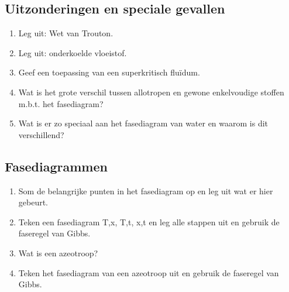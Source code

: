 \documentclass[12pt]{article}
\begin{document}
    \subsection{Uitzonderingen en speciale gevallen}
    \begin{enumerate}
        \item Leg uit: Wet van Trouton.
        \item Leg uit: onderkoelde vloeistof.
        \item Geef een toepassing van een superkritisch flu\"idum.
        \item Wat is het grote verschil tussen allotropen en gewone enkelvoudige stoffen m.b.t. het fasediagram?
        \item Wat is er zo speciaal aan het fasediagram van water en waarom is dit verschillend?
    \end{enumerate}

    \subsection{Fasediagrammen}
    \begin{enumerate}
        \item Som de belangrijke punten in het fasediagram op en leg uit wat er hier gebeurt.
        \item Teken een fasediagram {T,x}, {T,t}, {x,t} en leg alle stappen uit en gebruik de faseregel van Gibbs.
        \item Wat is een azeotroop?
        \item Teken het fasediagram van een azeotroop uit en gebruik de faseregel van Gibbs.
    \end{enumerate}
\end{document}
